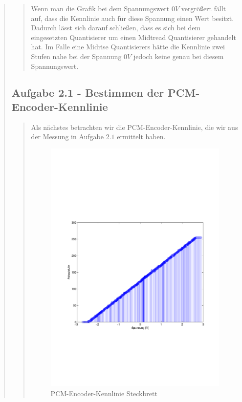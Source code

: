 \begin{quote}
\begin{quote}
        Wenn man die Grafik bei dem Spannungswert $0V$ vergrößert fällt auf, dass die Kennlinie auch für diese Spannung
        einen Wert besitzt. Dadurch lässt sich darauf schließen, dass es sich bei dem eingesetzten Quantisierer um
        einen Midtread Quantisierer gehandelt hat. Im Falle eine Midrise Quantisierers hätte die Kennlinie
        zwei Stufen nahe bei der Spannung $0V$ jedoch keine genau bei diesem Spannungswert.
        
        
    
    \end{quote}  %
    
    \subsection{Aufgabe 2.1 - Bestimmen der PCM-Encoder-Kennlinie}
    \begin{quote}
        
        Als nächstes betrachten wir die PCM-Encoder-Kennlinie, die wir aus der Messung in Aufgabe $2.1$ ermittelt haben.
        
        \begin{figure}[H]
        \centering
            \includegraphics[scale=0.7, trim = 2cm 7cm 1cm 9cm, clip]{./Bilder/Kennlinie_Aufgabe_2_1}
                \caption{PCM-Encoder-Kennlinie Steckbrett}
        \end{figure}
        

\end{quote}
\end{quote}
